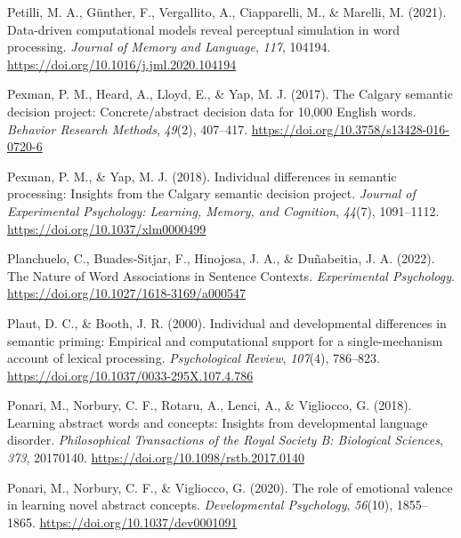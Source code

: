\documentclass[
  12pt,
  man,floatsintext]{apa7}
\newlength{\cslhangindent}
\newlength{\cslentryspacingunit} %
\newenvironment{CSLReferences}[2] %
 {%
  \setlength{\parindent}{0pt}
  \ifodd #1
  \let\oldpar\par
  \def\par{\hangindent=\cslhangindent\oldpar}
  \fi
  \setlength{\parskip}{#2\cslentryspacingunit}
 }%
 {}
\begin{document}
\begin{CSLReferences}{1}{0}
\leavevmode{}%
Petilli, M. A., Günther, F., Vergallito, A., Ciapparelli, M., \& Marelli, M. (2021). Data-driven computational models reveal perceptual simulation in word processing. \emph{Journal of Memory and Language}, \emph{117}, 104194. \url{https://doi.org/10.1016/j.jml.2020.104194}

\leavevmode{}%
Pexman, P. M., Heard, A., Lloyd, E., \& Yap, M. J. (2017). The {Calgary} semantic decision project: {Concrete}/abstract decision data for 10,000 {English} words. \emph{Behavior Research Methods}, \emph{49}(2), 407--417. \url{https://doi.org/10.3758/s13428-016-0720-6}

\leavevmode{}%
Pexman, P. M., \& Yap, M. J. (2018). Individual differences in semantic processing: {Insights} from the {Calgary} semantic decision project. \emph{Journal of Experimental Psychology: Learning, Memory, and Cognition}, \emph{44}(7), 1091--1112. \url{https://doi.org/10.1037/xlm0000499}

\leavevmode{}%
Planchuelo, C., Buades-Sitjar, F., Hinojosa, J. A., \& Duñabeitia, J. A. (2022). The {Nature} of {Word Associations} in {Sentence Contexts}. \emph{Experimental Psychology}. \url{https://doi.org/10.1027/1618-3169/a000547}

\leavevmode{}%
Plaut, D. C., \& Booth, J. R. (2000). Individual and developmental differences in semantic priming: {Empirical} and computational support for a single-mechanism account of lexical processing. \emph{Psychological Review}, \emph{107}(4), 786--823. \url{https://doi.org/10.1037/0033-295X.107.4.786}

\leavevmode{}%
Ponari, M., Norbury, C. F., Rotaru, A., Lenci, A., \& Vigliocco, G. (2018). Learning abstract words and concepts: {Insights} from developmental language disorder. \emph{Philosophical Transactions of the Royal Society B: Biological Sciences}, \emph{373}, 20170140. \url{https://doi.org/10.1098/rstb.2017.0140}

\leavevmode{}%
Ponari, M., Norbury, C. F., \& Vigliocco, G. (2020). The role of emotional valence in learning novel abstract concepts. \emph{Developmental Psychology}, \emph{56}(10), 1855--1865. \url{https://doi.org/10.1037/dev0001091}


\end{CSLReferences}
\end{document}
